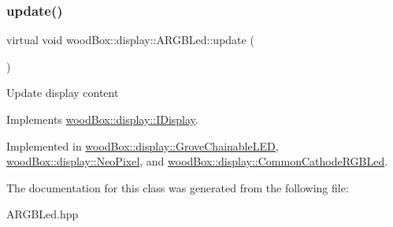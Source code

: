 \subsubsection{\texorpdfstring{update()}{update()}}
{\footnotesize\ttfamily virtual void wood\+Box\+::display\+::\+A\+R\+G\+B\+Led\+::update (\begin{DoxyParamCaption}{ }\end{DoxyParamCaption})\hspace{0.3cm}{\ttfamily [pure virtual]}}

Update display content 

Implements \mbox{\hyperlink{classwood_box_1_1display_1_1_i_display_ad8c0811b8b807ce119a06c7806004de7}{wood\+Box\+::display\+::\+I\+Display}}.



Implemented in \mbox{\hyperlink{classwood_box_1_1display_1_1_grove_chainable_l_e_d_a650969665d0b5607465a63159c62e4ef}{wood\+Box\+::display\+::\+Grove\+Chainable\+L\+ED}}, \mbox{\hyperlink{classwood_box_1_1display_1_1_neo_pixel_ac2ec48825a10154e0ef99c4d8010aa6e}{wood\+Box\+::display\+::\+Neo\+Pixel}}, and \mbox{\hyperlink{classwood_box_1_1display_1_1_common_cathode_r_g_b_led_a597c7ae002c7f94431ccaafd160a857a}{wood\+Box\+::display\+::\+Common\+Cathode\+R\+G\+B\+Led}}.



The documentation for this class was generated from the following file\+:\begin{DoxyCompactItemize}
\item 
A\+R\+G\+B\+Led.\+hpp\end{DoxyCompactItemize}
